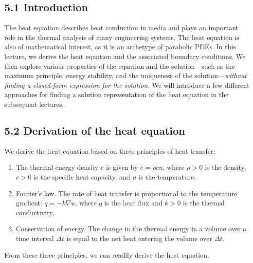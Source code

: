 

\subsection{5.1 Introduction}
The heat equation describes heat conduction in media and plays an important role in the thermal analysis of many engineering systems. The heat equation is also of mathematical interest, as it is an archetype of parabolic PDEs. In this lecture, we derive the heat equation and the associated boundary conditions. We then explore various properties of the equation and the solution---such as the maximum principle, energy stability, and the uniqueness of the solution---\textit{without finding a closed-form expression for the solution.} We will introduce a few different approaches for finding a solution representation of the heat equation in the subsequent lectures.

\subsection{5.2 Derivation of the heat equation}
We derive the heat equation based on three principles of heat transfer:
\begin{enumerate}
    \item The thermal energy density $e$ is given by $e = \rho c u$, where $\rho > 0$ is the density, $c > 0$ is the specific heat capacity, and $u$ is the temperature.
    \item Fourier's law. The rate of heat transfer is proportional to the temperature gradient: $q = -k \nabla u$, where $q$ is the heat flux and $k > 0$ is the thermal conductivity.
    \item Conservation of energy. The change in the thermal energy in a volume over a time interval $\Delta t$ is equal to the net heat entering the volume over $\Delta t$.
\end{enumerate}
From these three principles, we can readily derive the heat equation.

